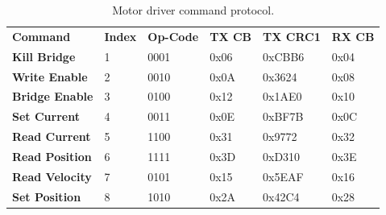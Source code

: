 \begin{table}[ht!]
\centering
\begin{tabular}{llllll}
\textbf{Command}       & \textbf{Index} & \textbf{Op-Code} & \textbf{TX CB} & \textbf{TX CRC1} & \textbf{RX  CB} \\
\textbf{Kill Bridge}   & 1              & 0001             & 0x06           & 0xCBB6           & 0x04            \\
\textbf{Write Enable}  & 2              & 0010             & 0x0A           & 0x3624           & 0x08            \\
\textbf{Bridge Enable} & 3              & 0100             & 0x12           & 0x1AE0           & 0x10            \\
\textbf{Set Current}   & 4              & 0011             & 0x0E           & 0xBF7B           & 0x0C            \\
\textbf{Read Current}  & 5              & 1100             & 0x31           & 0x9772           & 0x32            \\
\textbf{Read Position} & 6              & 1111             & 0x3D           & 0xD310           & 0x3E            \\
\textbf{Read Velocity} & 7              & 0101             & 0x15           & 0x5EAF           & 0x16            \\
\textbf{Set Position}  & 8              & 1010             & 0x2A           & 0x42C4           & 0x28           
\end{tabular}
\caption{Motor driver command protocol.}
\label{tab:motor-driver-protocol}
\end{table}